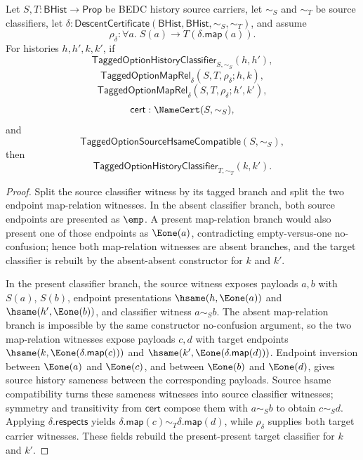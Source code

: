 \begin{theorem}
\label{thm:tagged-option-payload-descent-preserves-classification}
Let $S,T:\mathsf{BHist}\to\mathsf{Prop}$ be BEDC history source carriers, let
$\sim_S$ and $\sim_T$ be source classifiers, let
$\delta:\mathsf{DescentCertificate}(\mathsf{BHist},\mathsf{BHist},\sim_S,\sim_T)$,
and assume
$$
\rho_{\delta}:\forall a.\;S(a)\to T(\delta.\mathsf{map}(a)).
$$
For histories $h,h',k,k'$, if
$$
\mathsf{TaggedOptionHistoryClassifier}_{S,\sim_S}(h,h'),
$$
$$
\mathsf{TaggedOptionMapRel}_{\delta}(S,T,\rho_{\delta};h,k),
$$
$$
\mathsf{TaggedOptionMapRel}_{\delta}(S,T,\rho_{\delta};h',k'),
$$
$$
\mathsf{cert}:\NameCert(S,\sim_S),
$$
and
$$
\mathsf{TaggedOptionSourceHsameCompatible}(S,\sim_S),
$$
then
$$
\mathsf{TaggedOptionHistoryClassifier}_{T,\sim_T}(k,k').
$$
\end{theorem}
\begin{proof}
Split the source classifier witness by its tagged branch and split the two
endpoint map-relation witnesses. In the absent classifier branch, both source
endpoints are presented as $\emp$. A present map-relation branch would also
present one of those endpoints as $\Eone(a)$, contradicting empty-versus-one
no-confusion; hence both map-relation witnesses are absent branches, and the
target classifier is rebuilt by the absent-absent constructor for $k$ and $k'$.

In the present classifier branch, the source witness exposes payloads $a,b$ with
$S(a)$, $S(b)$, endpoint presentations
$\hsame(h,\Eone(a))$ and $\hsame(h',\Eone(b))$, and classifier witness
$a\sim_S b$. The absent map-relation branch is impossible by the same
constructor no-confusion argument, so the two map-relation witnesses expose
payloads $c,d$ with target endpoints
$\hsame(k,\Eone(\delta.\mathsf{map}(c)))$ and
$\hsame(k',\Eone(\delta.\mathsf{map}(d)))$. Endpoint inversion between
$\Eone(a)$ and $\Eone(c)$, and between $\Eone(b)$ and $\Eone(d)$, gives source
history sameness between the corresponding payloads. Source hsame compatibility
turns these sameness witnesses into source classifier witnesses; symmetry and
transitivity from $\mathsf{cert}$ compose them with $a\sim_S b$ to obtain
$c\sim_S d$. Applying $\delta.\mathsf{respects}$ yields
$\delta.\mathsf{map}(c)\sim_T\delta.\mathsf{map}(d)$, while
$\rho_{\delta}$ supplies both target carrier witnesses. These fields rebuild the
present-present target classifier for $k$ and $k'$.
\end{proof}

